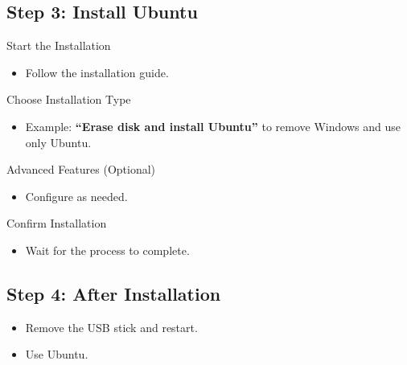 \subsection{Step 3: Install Ubuntu}
Start the Installation
\begin{itemize}
    \item Follow the installation guide.
\end{itemize}

Choose Installation Type
\begin{itemize}
    \item Example: \textbf{“Erase disk and install Ubuntu”} to remove Windows and use only Ubuntu.
\end{itemize}

Advanced Features (Optional)
\begin{itemize}
    \item Configure as needed.
\end{itemize}

Confirm Installation
\begin{itemize}
    \item Wait for the process to complete.
\end{itemize}

\subsection{Step 4: After Installation}
\begin{itemize}
    \item Remove the USB stick and restart.
    \item Use Ubuntu.
\end{itemize}